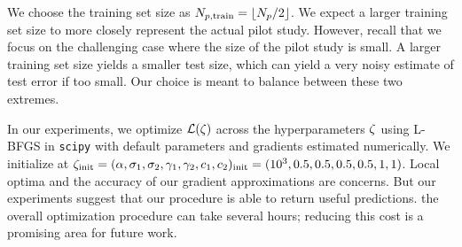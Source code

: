 We choose the training set size as $N_{p,\text{train}}=\lfloor N_{p}/2\rfloor$.
We expect a larger training set size to more closely represent the actual pilot study. However, recall that we focus on 
the challenging case where the size of the pilot study is small. A larger training set size yields a smaller test size, which
can yield a very noisy estimate of test error if too small. Our choice is meant to balance between these two extremes.

In our experiments, we optimize $\mathcal{L}(\allhyper)$ across the hyperparameters $\allhyper$
using L-BFGS in \texttt{scipy} with default parameters
and gradients estimated numerically. We initialize at $\allhyper_{\text{init}} =
(\mass, \rate{1},\rate{2}, \corr{1},\corr{2}, \conc{1},\conc{2})_{\text{init}} = (10^3, 0.5,0.5,0.5,0.5,1,1)$.
Local optima and the accuracy of our gradient approximations are concerns. But our experiments
suggest that our procedure is able to return useful predictions.
 the overall
optimization procedure can take several hours; reducing this cost is a promising area for future work.

